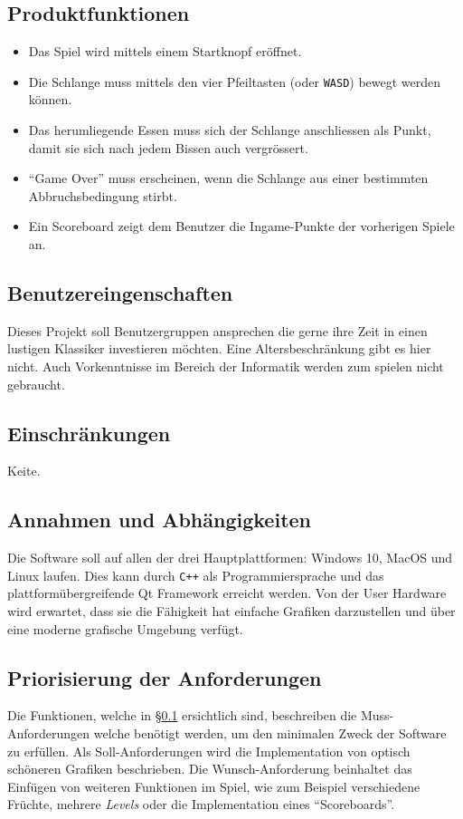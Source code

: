 \documentclass[a4paper, twosided, 11pt]{scrartcl}
\begin{document}
\subsection{Produktfunktionen} \label{sec:product-functions}
\begin{itemize}
  \item Das Spiel wird mittels einem Startknopf eröffnet.

  \item Die Schlange muss mittels den vier Pfeiltasten (oder \texttt{WASD})
    bewegt werden können.

  \item Das herumliegende Essen muss sich der Schlange anschliessen als Punkt,
    damit sie sich nach jedem Bissen auch vergrössert.

  \item ``Game Over'' muss erscheinen, wenn die Schlange aus einer bestimmten
    Abbruchsbedingung stirbt.

  \item Ein Scoreboard zeigt dem Benutzer die Ingame-Punkte der vorherigen Spiele an.
\end{itemize}

\subsection{Benutzereingenschaften}
Dieses Projekt soll Benutzergruppen ansprechen die gerne ihre Zeit in einen
lustigen Klassiker investieren möchten. Eine Altersbeschränkung gibt es hier
nicht. Auch Vorkenntnisse im Bereich der Informatik werden zum spielen nicht
gebraucht.

\subsection{Einschr\"ankungen}
Keite.

\subsection{Annahmen und Abh\"angigkeiten}
Die Software soll auf allen der drei Hauptplattformen: Windows 10, MacOS und
Linux laufen. Dies kann durch \texttt{C++} als Programmiersprache und das
plattformübergreifende Qt Framework erreicht werden. Von der User Hardware wird
erwartet, dass sie die Fähigkeit hat einfache Grafiken darzustellen und über
eine moderne grafische Umgebung verfügt.

\subsection{Priorisierung der Anforderungen}
Die Funktionen, welche in \S\ref{sec:product-functions} ersichtlich sind,
beschreiben die Muss-Anforderungen welche benötigt werden, um den minimalen
Zweck der Software zu erfüllen. Als Soll-Anforderungen wird die Implementation
von optisch schöneren Grafiken beschrieben.  Die Wunsch-Anforderung beinhaltet
das Einfügen von weiteren Funktionen im Spiel, wie zum Beispiel verschiedene
Früchte, mehrere \emph{Levels} oder die Implementation eines
``Scoreboards''.
\end{document}
